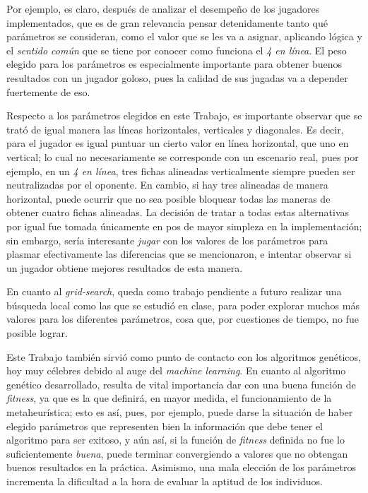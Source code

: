 \documentclass[12pt,a4paper]{article}
\begin{document}
Por ejemplo, es claro, después de analizar el desempeño de los jugadores implementados, que es de gran relevancia pensar detenidamente tanto qué parámetros se consideran, como el valor que se les va a asignar, aplicando lógica y el \textit{sentido común} que se tiene por conocer como funciona el \textit{4 en línea}. El peso elegido para los parámetros es especialmente importante para obtener buenos resultados con un jugador goloso, pues la calidad de sus jugadas va a depender fuertemente de eso.

Respecto a los parámetros elegidos en este Trabajo, es importante observar que se trató de igual manera las líneas horizontales, verticales y diagonales. Es decir, para el jugador es igual puntuar un cierto valor en línea horizontal, que uno en vertical; lo cual no necesariamente se corresponde con un escenario real, pues por ejemplo, en un \textit{4 en línea}, tres fichas alineadas verticalmente siempre pueden ser neutralizadas por el oponente. En cambio, si hay tres alineadas de manera horizontal, puede ocurrir que no sea posible bloquear todas las maneras de obtener cuatro fichas alineadas. La decisión de tratar a todas estas alternativas por igual fue tomada únicamente en pos de mayor simpleza en la implementación; sin embargo, sería interesante \textit{jugar} con los valores de los parámetros para plasmar efectivamente las diferencias que se mencionaron, e intentar observar si un jugador obtiene mejores resultados de esta manera.

En cuanto al \textit{grid-search}, queda como trabajo pendiente a futuro realizar una búsqueda local como las que se estudió en clase, para poder explorar muchos más valores para los diferentes parámetros, cosa que, por cuestiones de tiempo, no fue posible lograr.

Este Trabajo también sirvió como punto de contacto con los algoritmos genéticos, hoy muy célebres debido al auge del \textit{machine learning}. En cuanto al algoritmo genético desarrollado, resulta de vital importancia dar con una buena función de \textit{fitness}, ya que es la que definirá, en mayor medida, el funcionamiento de la metaheurística; esto es así, pues, por ejemplo, puede darse la situación de haber elegido parámetros que representen bien la información que debe tener el algoritmo para ser exitoso, y aún así, si la función de \textit{fitness} definida no fue lo suficientemente \textit{buena}, puede terminar convergiendo a valores que no obtengan buenos resultados en la práctica. Asimismo, una mala elección de los parámetros incrementa la dificultad a la hora de evaluar la aptitud de los individuos.
\end{document}

